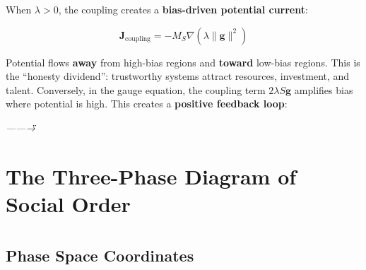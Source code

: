 \documentclass[12pt,a4paper]{article}
\theoremstyle{plain}
\theoremstyle{definition}
\newcommand{\gf}{\mathbf{g}}          %
\newcommand{\Sf}{S}                   %
\newcommand{\cn}[1]{\textcolor{scxgray}{\textit{#1}}}
\begin{document}
When $\lambda>0$, the coupling creates a \textbf{bias-driven potential current}:

\begin{equation}
    \mathbf{J}_{\text{coupling}} = -M_S \nabla (\lambda \|\gf\|^2)
    \label{eq:coupling_current}
\end{equation}

Potential flows \textbf{away} from high-bias regions and \textbf{toward}
low-bias regions. This is the ``honesty dividend'': trustworthy systems
attract resources, investment, and talent. Conversely, in the gauge
equation, the coupling term $2\lambda\Sf\gf$ amplifies bias where potential
is high. This creates a \textbf{positive feedback loop}:
\begin{center}
\end{center}

\bigskip
\noindent
\cn{——\"\"→}

\section{The Three-Phase Diagram of Social Order}
\section*{}

\subsection{Phase Space Coordinates}
\subsection*{}
\end{document}
